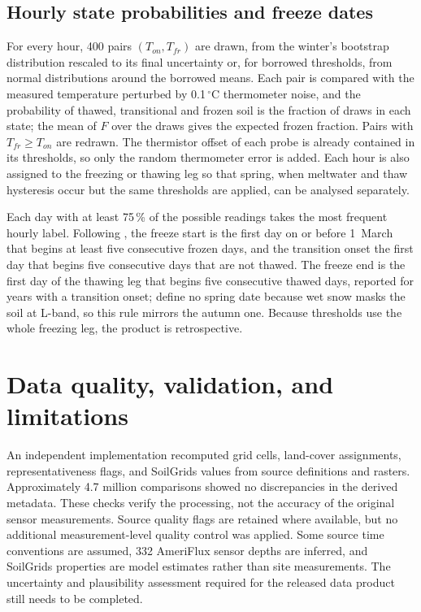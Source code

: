 \documentclass[essd,manuscript]{copernicus}
\begin{document}
\subsection{Hourly state probabilities and freeze dates}
\label{sec:state-hourly}
For every hour, 400 pairs $(T_{on},T_{fr})$ are drawn, from the winter's
bootstrap distribution rescaled to its final uncertainty or, for borrowed
thresholds, from normal distributions around the borrowed means. Each pair is
compared with the measured temperature perturbed by 0.1\,$^{\circ}$C
thermometer noise, and the probability of thawed, transitional and frozen soil
is the fraction of draws in each state; the mean of $F$ over the draws gives
the expected frozen fraction. Pairs with $T_{fr} \ge T_{on}$ are redrawn. The
thermistor offset of each probe is already contained in its thresholds, so
only the random thermometer error is added. Each hour is also assigned to the
freezing or thawing leg so that spring, when meltwater and thaw hysteresis
occur but the same thresholds are applied, can be analysed separately.

Each day with at least 75\,\% of the possible readings takes the most
frequent hourly label. Following \citet{rautiainen2025}, the freeze start is
the first day on or before 1~March that begins at least five consecutive
frozen days, and the transition onset the first day that begins five
consecutive days that are not thawed. The freeze end is the first day of the
thawing leg that begins five consecutive thawed days, reported for years with
a transition onset; \citet{rautiainen2025} define no spring date because wet
snow masks the soil at L-band, so this rule mirrors the autumn one. Because
thresholds use the whole freezing leg, the product is retrospective.

\section{Data quality, validation, and limitations}
An independent implementation recomputed grid cells, land-cover assignments,
representativeness flags, and SoilGrids values from source definitions and
rasters. Approximately 4.7 million comparisons showed no discrepancies in the
derived metadata. These checks verify the processing, not the accuracy of the
original sensor measurements. Source quality flags are retained where
available, but no additional measurement-level quality control was applied.
Some source time conventions are assumed, 332 AmeriFlux sensor depths are
inferred, and SoilGrids properties are model estimates rather than site
measurements. The uncertainty and plausibility assessment required for the
released data product still needs to be completed.
\end{document}
